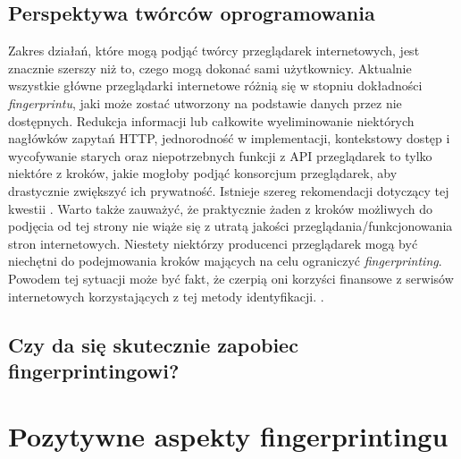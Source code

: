 \subsection{Perspektywa twórców oprogramowania}
Zakres działań, które mogą podjąć twórcy przeglądarek internetowych, jest
znacznie szerszy niż to, czego mogą dokonać sami użytkownicy. Aktualnie
wszystkie główne przeglądarki internetowe różnią się w stopniu dokładności
\emph{fingerprintu}, jaki może zostać utworzony na podstawie danych przez nie
dostępnych. Redukcja informacji lub całkowite wyeliminowanie niektórych
nagłówków zapytań HTTP, jednorodność w implementacji, kontekstowy dostęp i
wycofywanie starych oraz niepotrzebnych funkcji z API przeglądarek to tylko
niektóre z kroków, jakie mogłoby podjąć konsorcjum przeglądarek, aby drastycznie
zwiększyć ich prywatność. Istnieje szereg rekomendacji dotyczący tej kwestii
\cite{cooper2013rfc,doty2014fingerprinting,eckersley2010unique,nikiforakis2014workings}.
Warto także zauważyć, że praktycznie żaden z kroków możliwych do podjęcia od tej
strony nie wiąże się z utratą jakości przeglądania/funkcjonowania stron
internetowych. Niestety niektórzy producenci przeglądarek mogą być niechętni do
podejmowania kroków mających na celu ograniczyć \emph{fingerprinting}. Powodem
tej sytuacji może być fakt, że czerpią oni korzyści finansowe z serwisów
internetowych korzystających z tej metody identyfikacji. \cite[s.
13]{al2020too}.

\subsection{Czy da się skutecznie zapobiec fingerprintingowi?}

\section{Pozytywne aspekty fingerprintingu}
